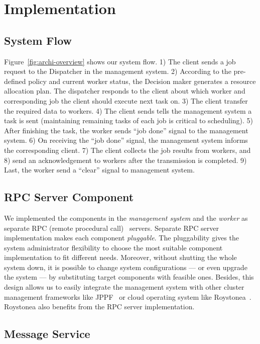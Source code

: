\section{Implementation}\label{sec:impl}  %

\subsection{System Flow}	%

Figure~\ref{fig:archi-overview} shows our system flow.
1) The client sends a job request to the Dispatcher in the management 
system.
2) According to the pre-defined policy and current worker status, the 
Decision maker generates a resource allocation plan.
The dispatcher responds to the client about which worker and
corresponding job the client should execute next task on.
3) The client transfer the required data to workers.
4) The client sends tells the management system a task is sent
(maintaining remaining tasks of each job is critical to scheduling).
5) After finishing the task, the worker sends ``job done'' signal to the
management system.
6) On receiving the ``job done'' signal,  the management system informs
the corresponding client.
7) The client collects the job results from workers, and
8) send an acknowledgement to workers after the transmission is 
completed.
9) Last, the worker send a ``clear'' signal to management system.

\subsection{RPC Server Component}

We implemented the components in the {\em management system} and the
{\em worker} as separate RPC (remote procedural call)~\cite{cite:RPC}
servers.
Separate RPC server implementation makes each component {\em pluggable}.
The pluggability gives the system administrator flexibility to choose
the most suitable component implementation to fit different needs.
Moreover, without shutting the whole system down, it is possible to
change system configurations --- or even upgrade the system --- by
substituting target components with feasible ones.
Besides, this design allows us to easily integrate the management system
with other cluster management frameworks like JPPF~\cite{cite:JPPF} or
cloud operating system like Roystonea~\cite{cite:roystonea}.
Roystonea also benefits from the RPC server implementation.

\subsection{Message Service} %


